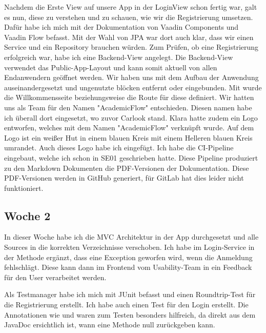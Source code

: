 Nachdem die Erste View auf unsere App in der LoginView schon fertig war, galt es nun, diese zu verstehen und zu schauen,
wie wir die Registrierung umsetzen.
Dafür habe ich mich mit der Dokumentation von Vaadin Components und Vaadin Flow befasst.
Mit der Wahl von JPA war dort auch klar, dass wir einen Service und ein Repository brauchen würden.
Zum Prüfen, ob eine Registrierung erfolgreich war, habe ich eine Backend-View angelegt.
Die Backend-View verwendet das Public-App-Layout und kann somit aktuell von allen Endanwendern
geöffnet werden.
Wir haben uns mit dem Aufbau der Anwendung auseinandergesetzt und ungenutzte blöcken entfernt oder
eingebunden.
Mit  wurde die Willkommensseite
beziehungsweise die Route für diese definiert.
Wir hatten uns als Team für den Namen "AcademicFlow" entschieden.
Diesen namen habe ich überall dort eingesetzt, wo zuvor Carlook stand.
Klara hatte zudem ein Logo entworfen, welches mit dem Namen "AcademicFlow" verknüpft wurde.
Auf dem Logo ist ein weißer Hut in einem blauen Kreis mit einem Helleren blauen
Kreis umrandet.
Auch dieses Logo habe ich eingefügt.
Ich habe die CI-Pipeline eingebaut, welche ich schon in SE01 geschrieben hatte.
Diese Pipeline produziert zu den Markdown Dokumenten die PDF-Versionen der Dokumentation.
Diese PDF-Versionen werden in GitHub generiert, für GitLab hat dies leider nicht funktioniert.

\subsection{Woche 2}\label{subsec:woche2}
In dieser Woche habe ich die MVC Architektur in der App durchgesetzt und alle Sources
in die korrekten Verzeichnisse verschoben.
Ich habe im Login-Service in der Methode  ergänzt, dass eine Exception
geworfen wird, wenn die Anmeldung fehlschlägt.
Diese kann dann im Frontend vom Usability-Team in ein Feedback für den User verarbeitet werden.

Als Testmanager habe ich mich mit JUnit befasst und einen Roundtrip-Test für die Registrierung erstellt.
Ich habe auch einen Test für den Login erstellt.
Die Annotationen wie  und 
waren zum Testen besonders hilfreich, da direkt aus dem
JavaDoc ersichtlich ist, wann eine Methode null zurückgeben kann.